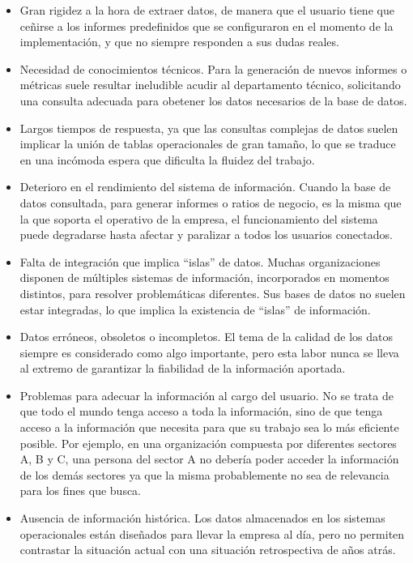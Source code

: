 \documentclass[a4paper,11pt]{article}
\begin{document}
    \begin{itemize}
      \item Gran rigidez a la hora de extraer datos, de manera que el usuario tiene que ceñirse a los informes predefinidos que se configuraron en el
      momento de la implementación, y que no siempre responden a sus dudas reales.
      \item Necesidad de conocimientos técnicos. Para la generación de nuevos informes o métricas suele resultar ineludible acudir al departamento técnico,
      solicitando una consulta adecuada para obetener los datos necesarios de la base de datos.
      \item Largos tiempos de respuesta, ya que las consultas complejas de datos suelen implicar la unión de tablas operacionales de gran tamaño, lo que se
      traduce en una incómoda espera que dificulta la fluidez del trabajo.
      \item Deterioro en el rendimiento del sistema de información. Cuando la base de datos consultada, para generar informes o ratios de negocio, es la
      misma que la que soporta el operativo de la empresa, el funcionamiento del sistema puede degradarse hasta afectar y paralizar a todos los usuarios
      conectados.
      \item Falta de integración que implica ``islas'' de datos. Muchas organizaciones disponen de múltiples sistemas de información, incorporados en
      momentos distintos, para resolver problemáticas diferentes. Sus bases de datos no suelen estar integradas, lo que implica la existencia de ``islas''
      de información.
      \item Datos erróneos, obsoletos o incompletos. El tema de la calidad de los datos siempre es considerado como algo importante, pero esta labor nunca
      se lleva al extremo de garantizar la fiabilidad de la información aportada.
      \item Problemas para adecuar la información al cargo del usuario. No se trata de que todo el mundo tenga acceso a toda la información, sino de que
      tenga acceso a la información que necesita para que su trabajo sea lo más eficiente posible. Por ejemplo, en una organización compuesta por
      diferentes sectores A, B y C, una persona del sector A no debería poder acceder la información de los demás sectores ya que la misma probablemente
      no sea de relevancia para los fines que busca.
      \item Ausencia de información histórica. Los datos almacenados en los sistemas operacionales están diseñados para llevar la empresa al día, pero no
      permiten contrastar la situación actual con una situación retrospectiva de años atrás.
    \end{itemize}
    
\end{document}
